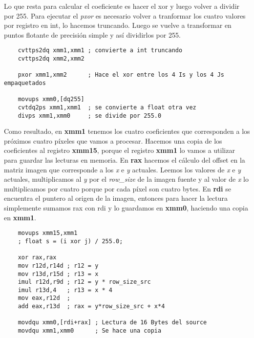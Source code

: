 \documentclass[a4paper]{article}
\begin{document}
\indent Lo que resta para calcular el coeficiente es hacer el xor y luego volver a dividir por 255. Para ejecutar el \textit{pxor} es necesario volver a tranformar los cuatro valores por registro en int, lo hacemos truncando. Luego se vuelve a transformar en puntos flotante de precisi\'on simple y as\'i dividirlos por 255.
 \begin{codesnippet}
\begin{verbatim}
    cvttps2dq xmm1,xmm1 ; convierte a int truncando
    cvttps2dq xmm2,xmm2

    pxor xmm1,xmm2      ; Hace el xor entre los 4 Is y los 4 Js empaquetados

    movups xmm0,[dq255]
    cvtdq2ps xmm1,xmm1  ; se convierte a float otra vez
    divps xmm1,xmm0     ; se divide por 255.0 
\end{verbatim}
\end{codesnippet}

\indent Como resultado, en \textbf{xmm1} tenemos los cuatro coeficientes que corresponden a los próximos cuatro p\'ixeles que vamos a procesar. Hacemos una copia de los coeficientes al registro \textbf{xmm15}, porque el registro \textbf{xmm1} lo vamos a utilizar para guardar las lecturas en memoria. En \textbf{rax} hacemos el c\'alculo del offset en la matriz imagen que corresponde a los \emph{x} e \emph{y} actuales. Leemos los valores de \emph{x} e \emph{y} actuales, multiplicamos al \emph{y} por el \textit{row_size} de la imagen fuente y al valor de \emph{x} lo multiplicamos por cuatro porque por cada p\'ixel son cuatro bytes. En \textbf{rdi} se encuentra el puntero al origen de la imagen, entonces para hacer la lectura simplemente sumamos rax con rdi y lo guardamos en \textbf{xmm0}, haciendo una copia en \textbf{xmm1}.
 \begin{codesnippet}
\begin{verbatim}
    movups xmm15,xmm1  
    ; float s = (i xor j) / 255.0;

    xor rax,rax
    mov r12d,r14d ; r12 = y
    mov r13d,r15d ; r13 = x
    imul r12d,r9d ; r12 = y * row_size_src
    imul r13d,4   ; r13 = x * 4
    mov eax,r12d  ; 
    add eax,r13d  ; rax = y*row_size_src + x*4 
    
    movdqu xmm0,[rdi+rax] ; Lectura de 16 Bytes del source
    movdqu xmm1,xmm0      ; Se hace una copia
\end{verbatim}
\end{codesnippet}
\end{document}
